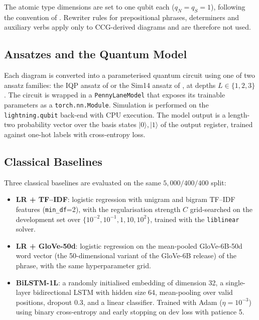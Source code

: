 \documentclass[11pt, a4paper]{article}
\begin{document}
The atomic type dimensions are set to one qubit each
(\(q_N = q_S = 1\)), following the convention of
\citet{lorenz2021}. Rewriter rules for prepositional phrases,
determiners and auxiliary verbs apply only to CCG-derived diagrams and
are therefore not used.

\subsection{Ansatzes and the Quantum Model}

Each diagram is converted into a parameterised quantum circuit using
one of two ansatz families: the IQP ansatz of
\citet{havlicek2019} or the Sim14 ansatz of \citet{sim2019}, at
depths \(L \in \{1, 2, 3\}\). The circuit is wrapped in a
\texttt{PennyLaneModel} that exposes its trainable parameters as a
\texttt{torch.nn.Module}. Simulation is performed on the
\texttt{lightning.qubit} back-end with CPU execution. The model output
is a length-two probability vector over the basis states
\(|0\rangle, |1\rangle\) of the output register, trained against
one-hot labels with cross-entropy loss.

\subsection{Classical Baselines}

Three classical baselines are evaluated on the same
\(5{,}000/400/400\) split:

\begin{itemize}
\item \textbf{LR + TF--IDF}: logistic regression with unigram and
bigram TF--IDF features (\texttt{min\_df}=2), with the regularisation
strength \(C\) grid-searched on the development set over
\(\{10^{-2}, 10^{-1}, 1, 10, 10^{2}\}\), trained with the
\texttt{liblinear} solver.

\item \textbf{LR + GloVe-50d}: logistic regression on the mean-pooled
GloVe-6B-50d word vector \citep{pennington2014} (the 50-dimensional variant of the GloVe-6B release) of the phrase, with the
same hyperparameter grid.

\item \textbf{BiLSTM-1L}: a randomly initialised embedding of
dimension 32, a single-layer bidirectional LSTM
\citep{hochreiter1997} with hidden size 64, mean-pooling over valid
positions, dropout 0.3, and a linear classifier. Trained with Adam
(\(\eta=10^{-3}\)) using binary cross-entropy and early stopping on
dev loss with patience 5.
\end{itemize}
\end{document}
